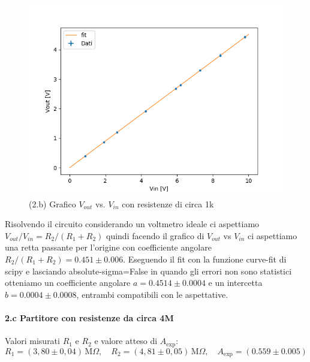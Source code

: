 \documentclass[10pt,a4paper]{article}
\begin{document}
\begin{figure}[h]
\centering
\includegraphics[scale=0.6]{plot_2b.png}
 

\caption{(2.b) Grafico $V_{out}$ vs. $V_{in}$ con resistenze di circa 1k \label{f:par1}}
\end{figure}

Risolvendo il circuito considerando un voltmetro ideale ci aspettiamo $V_{out}/V_{in} = R_2/(R_1+R_2)$ quindi facendo il grafico di $V_{out}$ vs $V_{in}$ ci aspettiamo una retta passante per l'origine con coefficiente angolare $R_2/(R_1+R_2) = 0.451 \pm 0.006$. Eseguendo il fit con la funzione curve-fit di scipy e lasciando absolute-sigma=False in quando gli errori non sono statistici otteniamo un coefficiente angolare $a=0.4514\pm0.0004$ e un intercetta $b=0.0004\pm0.0008$, entrambi compatibili con le aspettative. 


\paragraph{2.c Partitore con resistenze da circa 4M}
Valori misurati $R_1$ e $R_2$ e valore atteso di $A_\mathrm{exp}$:
\[
R_1 = ( 3,80 \pm 0,04 ) \,\mathrm{M}\Omega, \quad
R_2 = ( 4,81 \pm 0,05 ) \,\mathrm{M}\Omega, \quad
A_\mathrm{exp} = ( 0.559 \pm 0.005 ) 
\]
\end{document}
